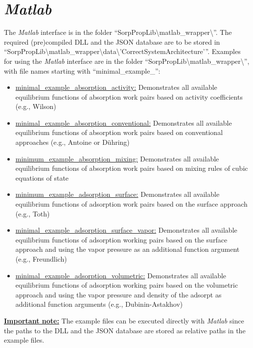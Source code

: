 \section{\textit{Matlab}}
\label{cha:usage:matlab}
%
The \textit{Matlab} interface is in the folder “SorpPropLib\textbackslash matlab\_wrapper\textbackslash ”. The required (pre)compiled DLL and the JSON database are to be stored in “SorpPropLib\textbackslash matlab\_wrapper\textbackslash  data\textbackslash 'CorrectSystemArchitecture'”. Examples for using the \textit{Matlab} interface are in the folder “SorpPropLib\textbackslash matlab\_wrapper\textbackslash ”, with file names starting with “minimal\_example\_”:
\begin{itemize}
	\item \underline{minimal\_example\_absorption\_activity:} Demonstrates all available equilibrium functions of absorption work pairs based on activity coefficients (e.g., Wilson)
	\item \underline{minimal\_example\_absorption\_conventional:} Demonstrates all available equilibrium functions of absorption work pairs based on conventional approaches (e.g., Antoine or Dühring)
	\item \underline{minimum\_example\_absorption\_mixing:} Demonstrates all available equilibrium functions of absorption work pairs based on mixing rules of cubic equations of state
	\item \underline{minimum\_example\_adsorption\_surface:} Demonstrates all available equilibrium functions of adsorption work pairs based on the surface approach (e.g., Toth)
	\item \underline{minimal\_example\_adsorption\_surface\_vapor:} Demonstrates all available equilibrium functions of adsorption working pairs based on the surface approach and using the vapor pressure as an additional function argument (e.g., Freundlich)
	\item \underline{minimal\_example\_adsorption\_volumetric:} Demonstrates all available equilibrium functions of adsorption working pairs based on the volumetric approach and using the vapor pressure and density of the adsorpt as additional function arguments (e.g., Dubinin-Astakhov)
\end{itemize}
\textbf{\underline{Important note:}} The example files can be executed directly with \textit{Matlab} since the paths to the DLL and the JSON database are stored as relative paths in the example files.
